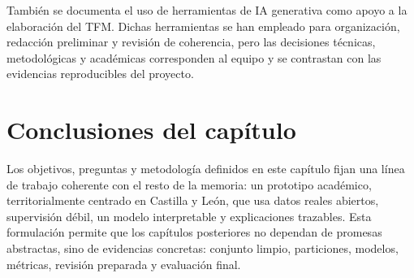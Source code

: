 También se documenta el uso de herramientas de IA generativa como apoyo a la elaboración del TFM. Dichas herramientas se han empleado para organización, redacción preliminar y revisión de coherencia, pero las decisiones técnicas, metodológicas y académicas corresponden al equipo y se contrastan con las evidencias reproducibles del proyecto.

\section{Conclusiones del capítulo}

Los objetivos, preguntas y metodología definidos en este capítulo fijan una línea de trabajo coherente con el resto de la memoria: un prototipo académico, territorialmente centrado en Castilla y León, que usa datos reales abiertos, supervisión débil, un modelo interpretable y explicaciones trazables. Esta formulación permite que los capítulos posteriores no dependan de promesas abstractas, sino de evidencias concretas: conjunto limpio, particiones, modelos, métricas, revisión preparada y evaluación final.
